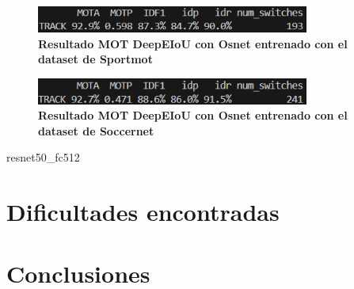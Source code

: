 \documentclass[12pt, a4paper, twoside]{article}
\begin{document}
	\begin{figure}[H]
		\centering
		\includegraphics[width=0.8\textwidth]{image/metricas_mot_deepEIoU_osnet_sportmot}
		\caption{\textbf{Resultado MOT DeepEIoU con Osnet entrenado con el dataset de Sportmot}}
		\label{fig:Resultado DeepEIoU con Osnet mot sportmot}
	\end{figure}
	
	\begin{figure}[H]
		\centering
		\includegraphics[width=0.8\textwidth]{image/metricas_mot_deepEIoU_osnet_soccernet}
		\caption{\textbf{Resultado MOT DeepEIoU con Osnet entrenado con el dataset de Soccernet}}
		\label{fig:Resultado DeepEIoU con Osnet mot soccernet}
	\end{figure}
	
	resnet50\_fc512
	
	\section{Dificultades encontradas}
	
	
	
	\section{Conclusiones}
	
	
	
	\printbibliography
	
	
	
	
\end{document}
